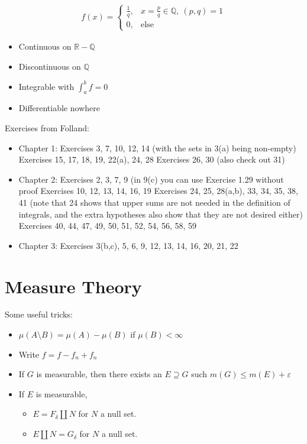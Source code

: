 \begin{align*}
f ( x ) = \begin{cases}
\frac 1 q, & x = \frac p q \in {\mathbb{Q}},~(p,q) = 1 \\
0, & \text{else}
\end{cases}
\end{align*}

\begin{itemize}
\tightlist
\item
  Continuous on \({\mathbb{R}}-{\mathbb{Q}}\)
\item
  Discontinuous on \({\mathbb{Q}}\)
\item
  Integrable with \(\int_a^b f = 0\)
\item
  Differentiable nowhere
\end{itemize}

Exercises from Folland:

\begin{itemize}
\item
  Chapter 1: Exercises 3, 7, 10, 12, 14 (with the sets in 3(a) being
  non-empty) Exercises 15, 17, 18, 19, 22(a), 24, 28 Exercises 26, 30
  (also check out 31)
\item
  Chapter 2: Exercises 2, 3, 7, 9 (in 9(c) you can use Exercise 1.29
  without proof Exercises 10, 12, 13, 14, 16, 19 Exercises 24, 25,
  28(a,b), 33, 34, 35, 38, 41 (note that 24 shows that upper sums are
  not needed in the definition of integrals, and the extra hypotheses
  also show that they are not desired either) Exercises 40, 44, 47, 49,
  50, 51, 52, 54, 56, 58, 59
\item
  Chapter 3: Exercises 3(b,c), 5, 6, 9, 12, 13, 14, 16, 20, 21, 22
\end{itemize}

\hypertarget{measure-theory}{%
\section{Measure Theory}\label{measure-theory}}

\begin{fact}

Some useful tricks:

\begin{itemize}
\tightlist
\item
  \(\mu(A\setminus B) = \mu(A) - \mu(B)\) if \(\mu(B) < \infty\)
\item
  Write \(f = f-f_n + f_n\)
\item
  If \(G\) is measurable, then there exists an \(E \supseteq G\) such
  \(m(G) \leq m(E) + {\varepsilon}\)
\item
  If \(E\) is measurable,

  \begin{itemize}
  \tightlist
  \item
    \(E = F_{\delta} {\textstyle\coprod}N\) for \(N\) a null set.
  \item
    \(E {\textstyle\coprod}N = G_{\delta}\) for \(N\) a null set.
  \end{itemize}
\end{itemize}

\end{fact}

